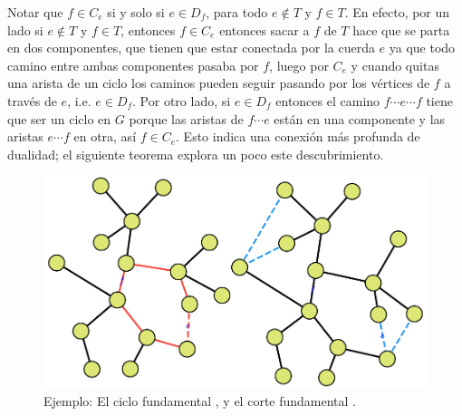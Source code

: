 \documentclass[../main.tex]{subfiles}
\begin{document}
Notar que $f \in C_e$ si y solo si $e \in D_f$, para todo $e \not \in T$ y $f \in T$. En efecto, por un lado si $e \not \in T$ y $f \in T$, entonces $f \in C_e$ entonces sacar a $f$ de $T$ hace que se parta en dos componentes, que tienen que estar conectada por la cuerda $e$ ya que todo camino entre ambas componentes pasaba por $f$, luego por $C_e$ y cuando quitas una arista de un ciclo los caminos pueden seguir pasando por los vértices de $f$ a través de $e$, i.e. $e \in D_f$. Por otro lado, si $e \in D_f$ entonces el camino $f \cdots e \cdots f$ tiene que ser un ciclo en $G$ porque las aristas de $f \cdots e$ están en una componente y las aristas $e \cdots f$ en otra, así $f \in C_e$. Esto indica una conexión más profunda de dualidad; el siguiente teorema explora un poco este descubrimiento.

\begin{figure}
\includegraphics[width=\linewidth]{"./Apendice/Figuras/Capitulo 1/Dibujo 1.pdf"}
\caption{Ejemplo: El ciclo fundamental , y el corte fundamental .}
\end{figure}
\end{document}
